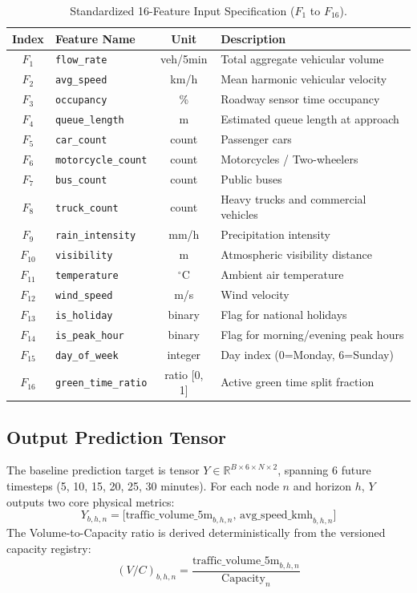 \begin{table}[H]
\centering
\caption{Standardized 16-Feature Input Specification ($F_1$ to $F_{16}$).}
\label{tab:features}
\begin{tabular}{|c|l|c|l|}
\hline
\rowcolor{blue!10}
\textbf{Index} & \textbf{Feature Name} & \textbf{Unit} & \textbf{Description} \\
\hline
$F_1$ & \texttt{flow\_rate} & veh/5min & Total aggregate vehicular volume \\
$F_2$ & \texttt{avg\_speed} & km/h & Mean harmonic vehicular velocity \\
$F_3$ & \texttt{occupancy} & \% & Roadway sensor time occupancy \\
$F_4$ & \texttt{queue\_length} & m & Estimated queue length at approach \\
$F_5$ & \texttt{car\_count} & count & Passenger cars \\
$F_6$ & \texttt{motorcycle\_count} & count & Motorcycles / Two-wheelers \\
$F_7$ & \texttt{bus\_count} & count & Public buses \\
$F_8$ & \texttt{truck\_count} & count & Heavy trucks and commercial vehicles \\
$F_9$ & \texttt{rain\_intensity} & mm/h & Precipitation intensity \\
$F_{10}$ & \texttt{visibility} & m & Atmospheric visibility distance \\
$F_{11}$ & \texttt{temperature} & $^\circ\text{C}$ & Ambient air temperature \\
$F_{12}$ & \texttt{wind\_speed} & m/s & Wind velocity \\
$F_{13}$ & \texttt{is\_holiday} & binary & Flag for national holidays \\
$F_{14}$ & \texttt{is\_peak\_hour} & binary & Flag for morning/evening peak hours \\
$F_{15}$ & \texttt{day\_of\_week} & integer & Day index (0=Monday, 6=Sunday) \\
$F_{16}$ & \texttt{green\_time\_ratio} & ratio [0, 1] & Active green time split fraction \\
\hline
\end{tabular}
\end{table}

\subsection{Output Prediction Tensor}
The baseline prediction target is tensor $Y \in \mathbb{R}^{B \times 6 \times N \times 2}$, spanning 6 future timesteps (5, 10, 15, 20, 25, 30 minutes). For each node $n$ and horizon $h$, $Y$ outputs two core physical metrics:
\begin{equation}
  Y_{b,h,n} = \big[ \text{traffic\_volume\_5m}_{b,h,n}, \, \text{avg\_speed\_kmh}_{b,h,n} \big]
\end{equation}
The Volume-to-Capacity ratio is derived deterministically from the versioned capacity registry:
\begin{equation}
  (V/C)_{b,h,n} = \frac{\text{traffic\_volume\_5m}_{b,h,n}}{\text{Capacity}_{n}}
\end{equation}

